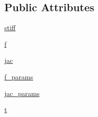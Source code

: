 \subsection*{Public Attributes}
\begin{DoxyCompactItemize}
\item 
\hyperlink{classscipy_1_1integrate_1_1__ode_1_1ode_a680032936169fe91fd3e43f209860e26}{stiff}
\item 
\hyperlink{classscipy_1_1integrate_1_1__ode_1_1ode_ae93e599b0e818bf07f05e0f7e9c6d417}{f}
\item 
\hyperlink{classscipy_1_1integrate_1_1__ode_1_1ode_ae8cbb591c6c002c709eb845b3b8188bd}{jac}
\item 
\hyperlink{classscipy_1_1integrate_1_1__ode_1_1ode_a43a6b1b3c7f876449e3721dce0c58296}{f\+\_\+params}
\item 
\hyperlink{classscipy_1_1integrate_1_1__ode_1_1ode_a73985726afe87adb6139fcd1a6a3ade8}{jac\+\_\+params}
\item 
\hyperlink{classscipy_1_1integrate_1_1__ode_1_1ode_a68add56e453a1a3b5776695f1cbe61d1}{t}
\end{DoxyCompactItemize}


